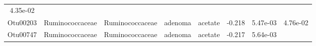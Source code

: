\documentclass[11pt,]{article}
\begin{document}
\begin{longtable}[]{@{}cccccccc@{}}
\begin{minipage}[t]{0.08\columnwidth}
4.35e-02\strut
\end{minipage}\tabularnewline
\begin{minipage}[t]{0.08\columnwidth}\centering\strut
Otu00203\strut
\end{minipage} & \begin{minipage}[t]{0.15\columnwidth}\centering\strut
Ruminococcaceae\strut
\end{minipage} & \begin{minipage}[t]{0.15\columnwidth}\centering\strut
Ruminococcaceae\strut
\end{minipage} & \begin{minipage}[t]{0.08\columnwidth}\centering\strut
adenoma\strut
\end{minipage} & \begin{minipage}[t]{0.09\columnwidth}\centering\strut
acetate\strut
\end{minipage} & \begin{minipage}[t]{0.07\columnwidth}\centering\strut
-0.218\strut
\end{minipage} & \begin{minipage}[t]{0.08\columnwidth}\centering\strut
5.47e-03\strut
\end{minipage} & \begin{minipage}[t]{0.08\columnwidth}\centering\strut
4.76e-02\strut
\end{minipage}\tabularnewline
\begin{minipage}[t]{0.08\columnwidth}\centering\strut
Otu00747\strut
\end{minipage} & \begin{minipage}[t]{0.15\columnwidth}\centering\strut
Ruminococcaceae\strut
\end{minipage} & \begin{minipage}[t]{0.15\columnwidth}\centering\strut
Ruminococcaceae\strut
\end{minipage} & \begin{minipage}[t]{0.08\columnwidth}\centering\strut
adenoma\strut
\end{minipage} & \begin{minipage}[t]{0.09\columnwidth}\centering\strut
acetate\strut
\end{minipage} & \begin{minipage}[t]{0.07\columnwidth}\centering\strut
-0.217\strut
\end{minipage} & \begin{minipage}[t]{0.08\columnwidth}\centering\strut
5.64e-03\strut
\end{minipage} & \begin{minipage}[t]{0.08\columnwidth}\centering\strut

\end{minipage}
\end{longtable}
\end{document}
